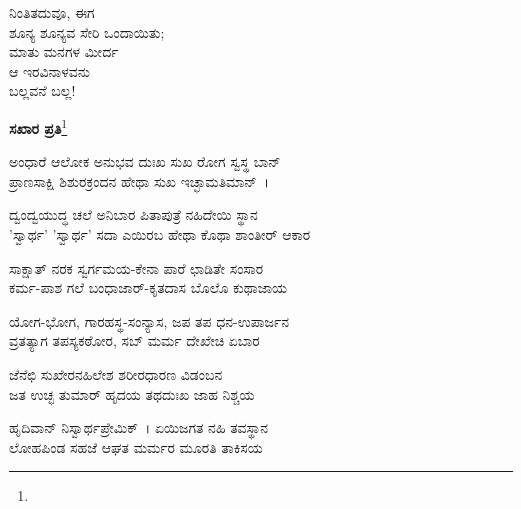 \begin{myquote}
ನಿಂತಿತದುವೂ, ಈಗ\\ಶೂನ್ಯ ಶೂನ್ಯವ ಸೇರಿ ಒಂದಾಯಿತು;\\ಮಾತು ಮನಗಳ ಮೀರ್ದ\\ಆ ಇರವಿನಾಳವನು\\ಬಲ್ಲವನೆ ಬಲ್ಲ!
\end{myquote}

\begin{center}
\textbf{ಸಖಾರ ಪ್ರತಿ}\footnote{}
\end{center}

\begin{myquote}
ಅಂಧಾರೆ ಆಲೋಕ ಅನುಭವ ದುಃಖ ಸುಖ ರೋಗ ಸ್ವಸ್ಥ ಬಾನ್\\ಪ್ರಾಣಸಾಕ್ಷಿ ಶಿಶುರಕ್ರಂದನ ಹೇಥಾ ಸುಖ ಇಚ್ಛಾಮತಿಮಾನ್~।
\end{myquote}


\begin{myquote}
ದ್ವಂದ್ವಯುದ್ಧ ಚಲೆ ಅನಿಬಾರ ಪಿತಾಪುತ್ರೆ ನಹಿದೇಯಿ ಸ್ಥಾನ\\'ಸ್ವಾರ್ಥ' 'ಸ್ವಾರ್ಥ' ಸದಾ ಎಯಿರಬ ಹೇಥಾ ಕೊಥಾ ಶಾಂತೀರ್ ಆಕಾರ
\end{myquote}


\begin{myquote}
ಸಾಕ್ಷಾತ್ ನರಕ ಸ್ವರ್ಗಮಯ-ಕೇನಾ ಪಾರೆ ಛಾಡಿತೇ ಸಂಸಾರ\\ಕರ್ಮ-ಪಾಶ ಗಲೆ ಬಂಧಾಜಾರ್-ಕೃತದಾಸ ಬೊಲೊ ಕುಥಾಜಾಯ
\end{myquote}


\begin{myquote}
ಯೋಗ-ಭೋಗ, ಗಾರಹಸ್ಥ-ಸಂನ್ಯಾಸ, ಜಪ ತಪ ಧನ-ಉಪಾರ್ಜನ\\ವ್ರತತ್ಯಾಗ ತಪಸ್ಯಕಠೋರ, ಸಬ್ ಮರ್ಮ ದೇಖೇಚಿ ಏಬಾರ
\end{myquote}


\begin{myquote}
ಜೆನೆಛಿ ಸುಖೇರನಹಿಲೇಶ ಶರೀರಧಾರಣ ವಿಡಂಬನ\\ಜತ ಉಚ್ಛ ತುಮಾರ್‌ ಹೃದಯ ತಥದುಃಖ ಜಾಹ ನಿಶ್ಚಯ
\end{myquote}


\begin{myquote}
ಹೃದಿವಾನ್ ನಿಸ್ವಾರ್ಥಪ್ರೇಮಿಕ್~। ಏಯಿಜಗತ ನಹಿ ತವಸ್ಥಾನ\\ಲೋಹಪಿಂಡ ಸಹಜೆ ಆಘತ ಮರ್ಮರ ಮೂರತಿ ತಾಕಿಸಯ
\end{myquote}


